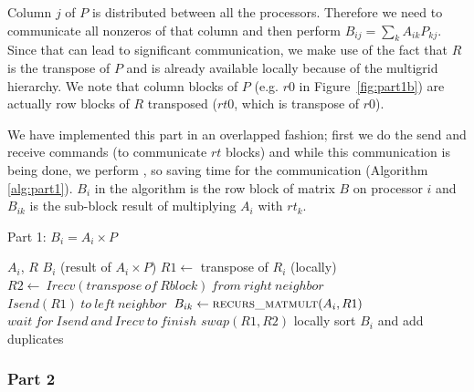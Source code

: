 Column $j$ of $P$ is distributed between all the processors. Therefore we need to communicate all nonzeros of that column and then perform $B_{ij} = \sum_{k} A_{ik} P_{kj}$. Since that can lead to significant communication, we make use of the fact that $R$ is the transpose of $P$ and is already available locally because of the multigrid hierarchy. We note that column blocks of $P$ (e.g. $r0$ in Figure~\ref{fig:part1b}) are actually row blocks of $R$ transposed ($rt0$, which is transpose of $r0$).

We have implemented this part in an overlapped fashion; first we do the send and receive commands (to communicate $rt$ blocks) and while this communication is being done, we perform \mm, so saving time for the communication (Algorithm \ref{alg:part1}). $B_{i}$ in the algorithm is the row block of matrix $B$ on processor $i$ and $B_{ik}$ is the sub-block result of multiplying $A_i$ with $rt_k$.

\begin{algorithm}[H] 
  \caption{Part 1: $B_i = A_i \times P$} \label{alg:part1} 
  \begin{algorithmic}[1]
    \Require $A_i$, $R$
    \Ensure  $B_i$ (result of $A_i \times P$)
    \State $R1 \leftarrow$ transpose of $R_i$ (locally)
      \State $R2 \leftarrow\ Irecv(transpose\ of\ R block)\ from\ right\ neighbor$
      \State $Isend(R1)\ to\ left\ neighbor$
      \State $B_{ik} \leftarrow \textsc{recurs\_matmult}(A_i, R1)$ 
      \State $wait\ for\ Isend\ and\ Irecv\ to\ finish$
      \State $swap(R1,R2)$
    \EndFor
    \State locally sort $B_i$ and add duplicates
  \end{algorithmic}
\end{algorithm}


\subsubsection{Part 2}

